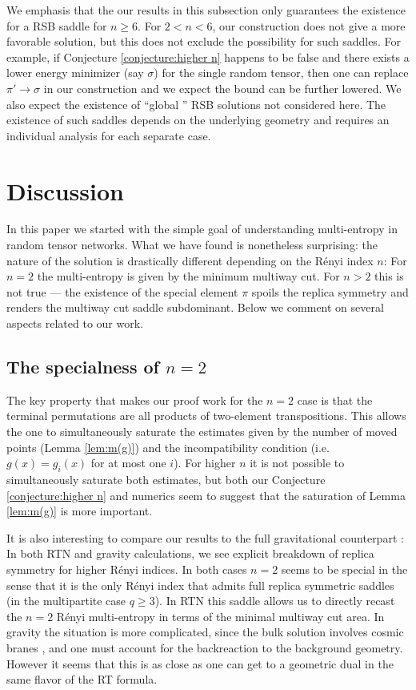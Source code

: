\documentclass[11pt,oneside,letterpaper]{article}
\numberwithin{equation}{section}
\theoremstyle{definition}
\theoremstyle{remark}
\begin{document}
We emphasis that the our results in this subsection only guarantees the existence for a RSB saddle for $n\ge 6$. For $2<n< 6$, our construction does not give a more favorable solution, but this does not exclude the possibility for such saddles. For example, if Conjecture \ref{conjecture:higher n} happens to be false and there exists a lower energy minimizer (say $\sigma$) for the single random tensor, then one can replace $\pi'\to \sigma$ in our construction and we expect the bound can be further lowered. We also expect the existence of ``global '' RSB solutions not considered here. The existence of such saddles depends on the underlying geometry and requires an individual analysis for each separate case.


\section{Discussion}
\label{sec:discussion}

In this paper we started with the simple goal of understanding multi-entropy in random tensor networks. What we have found is nonetheless surprising: the nature of the solution is drastically different depending on the R\'enyi index $n$: For $n=2$ the multi-entropy is given by the minimum multiway cut. For $n>2$ this is not true --- the existence of the special element $\pi$ spoils the replica symmetry and renders the multiway cut saddle subdominant. Below we comment on several aspects related to our work.

\subsection*{The specialness of $n=2$}
The key property that makes our proof work for the $n=2$ case is that the terminal permutations are all products of two-element transpositions. This allows the one to simultaneously saturate the estimates given by the number of moved points (Lemma \ref{lem:m(g)}) and the incompatibility condition (i.e. $g(x)=g_i(x)$ for at most one $i$).
For higher $n$ it is not possible to simultaneously saturate both estimates, but both our Conjecture \ref{conjecture:higher n} and numerics seem to suggest that the saturation of Lemma \ref{lem:m(g)} is more important.

It is also interesting to compare our results to the full gravitational counterpart \cite{Gadde:2024taa}: In both RTN and gravity calculations, we see explicit breakdown of replica symmetry for higher R\'enyi indices. In both cases $n=2$ seems to be special in the sense that it is the only R\'enyi index that admits full replica symmetric saddles (in the multipartite case $q \geq 3$). In RTN this saddle allows us to directly recast the $n=2$ R\'enyi multi-entropy in terms of the minimal multiway cut area. In gravity the situation is more complicated, since the bulk solution involves cosmic branes \cite{Dong:2016fnf,Dong:2023bfy}, and one must account for the backreaction to the background geometry.
However it seems that this is as close as one can get to a geometric dual in the same flavor of the RT formula.
\end{document}
